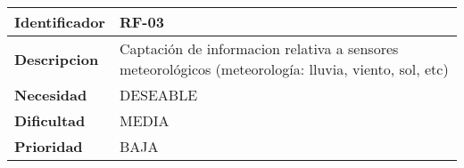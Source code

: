 \begin{center}
    \begin{tabular}{|p{2.6cm}|p{12cm}|}
    \hline
    \textbf{Identificador} & RF-03\\
    \hline
    \textbf{Descripcion} & Captación de informacion relativa a sensores meteorológicos (meteorología: lluvia, viento, sol, etc)\\
    \hline
    \textbf{Necesidad} & DESEABLE\\
    \hline
    \textbf{Dificultad} & MEDIA\\
    \hline
    \textbf{Prioridad} & BAJA\\
    \hline
    \end{tabular}
\end{center}
